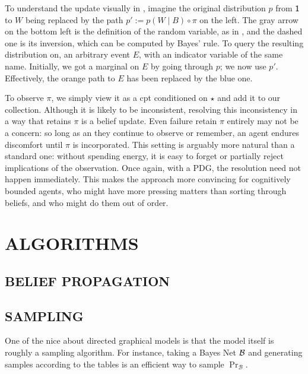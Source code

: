 \documentclass{article}
\newcommand{\MN}{PDG}
\numberwithin{equation}{section}
\begin{document}
	To understand the update visually in , imagine the original distribution $p$ from $\sf 1$ to $W$ being replaced by the path $p' := p(W \mid B) \circ \pi$  on the left. The gray arrow on the bottom left is the definition of the random variable, as in , and the dashed one is its inversion, which can be computed by Bayes' rule.  %
	To query the resulting distribution on, an arbitrary event $E$, with an indicator variable of the same name. Initially, we got a marginal on $E$ by going through $p$; we now use $p'$. Effectively, the orange path to $E$ has been replaced by the blue one.

	
	To observe $\pi$, we simply view it as a cpt conditioned on $\star$ and add it to our collection. 
	Although it is likely to be inconsistent, resolving this inconsistency in a way that retains $\pi$ is a belief update. 
	Even failure retain $\pi$ entirely may not be a concern: so long as an they continue to observe or remember, an agent endures discomfort until $\pi$ is incorporated. This setting is arguably more natural than a standard one: without spending energy, it is easy to forget or partially reject implications of the observation.	
	Once again, with a \MN, the resolution need not happen immediately. This makes the approach more convincing for cognitively bounded agents, who might have more pressing matters than sorting through beliefs, and who might do them out of order.

	\section{ALGORITHMS}\label{sec:algorithms}
	\subsection{BELIEF PROPAGATION}
	
	
	\subsection{SAMPLING}
	
	One of the nice about directed graphical models is that the model itself is roughly a sampling algorithm. For instance, taking a Bayes Net $\cal B$ and generating samples according to the tables is an efficient way to sample $\Pr_{\mathcal B}$.
\end{document}
